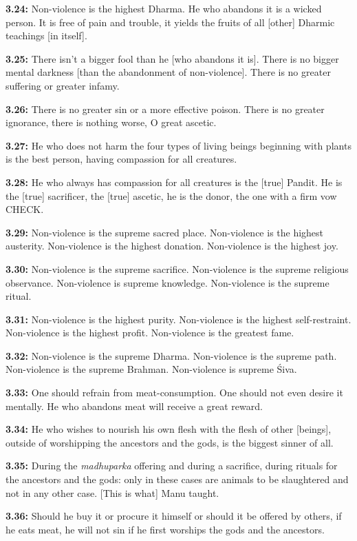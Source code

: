 \documentclass{article}
\newcommand{\vsnum}[1]{\textbf{#1}}
\newcommand{\skt}[1]{\textit{#1}}
\begin{document}
\vsnum{3.24: }Non-violence is the highest Dharma. He who abandons it is a wicked person. It is free of pain and trouble, it yields the fruits of all [other] Dharmic teachings [in itself].

\vsnum{3.25: }There isn't a bigger fool than he [who abandons it is]. There is no bigger mental darkness [than the abandonment of non-violence]. There is no greater suffering or greater infamy.

\vsnum{3.26: }There is no greater sin or a more effective poison. There is no greater ignorance, there is nothing worse, O great ascetic.

\vsnum{3.27: }He who does not harm the four types of living beings beginning with plants is the best person, having compassion for all creatures.

\vsnum{3.28: }He who always has compassion for all creatures is the [true] Pandit. He is the [true] sacrificer, the [true] ascetic, he is the donor, the one with a firm vow CHECK.

\vsnum{3.29: }Non-violence is the supreme sacred place. Non-violence is the highest austerity. Non-violence is the highest donation. Non-violence is the highest joy.

\vsnum{3.30: }Non-violence is the supreme sacrifice. Non-violence is the supreme religious observance. Non-violence is supreme knowledge. Non-violence is the supreme ritual.

\vsnum{3.31: }Non-violence is the highest purity. Non-violence is the highest self-restraint. Non-violence is the highest profit. Non-violence is the greatest fame.

\vsnum{3.32: }Non-violence is the supreme Dharma. Non-violence is the supreme path. Non-violence is the supreme Brahman. Non-violence is supreme Śiva.

\vsnum{3.33: }One should refrain from meat-consumption. One should not even desire it mentally. He who abandons meat will receive a great reward.

\vsnum{3.34: }He who wishes to nourish his own flesh with the flesh of other [beings], outside of worshipping the ancestors and the gods, is the biggest sinner of all.

\vsnum{3.35: }During the \skt{madhuparka} offering and during a sacrifice, during rituals for the ancestors and the gods: only in these cases are animals to be slaughtered and not in any other case. [This is what] Manu taught.

\vsnum{3.36: }Should he buy it or procure it himself or should it be offered by others, if he eats meat, he will not sin if he first worships the gods and the ancestors.
\end{document}

